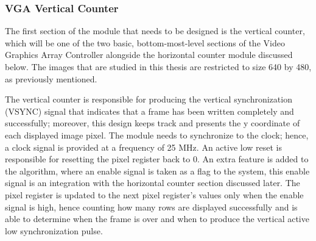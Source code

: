\subsubsection{VGA Vertical Counter}
\par The first section of the module that needs to be designed is the vertical counter, which will be one of the two basic, bottom-most-level sections of the Video Graphics Array Controller alongside the horizontal counter module discussed below. The images that are studied in this thesis are restricted to size 640 by 480, as previously mentioned. \newline
\par The vertical counter is responsible for producing the vertical synchronization (VSYNC) signal that indicates that a frame has been written completely and successfully; moreover, this design keeps track and presents the y coordinate of each displayed image pixel. The module needs to synchronize to the clock; hence, a clock signal is provided at a frequency of 25 MHz. An active low reset is responsible for resetting the pixel register back to 0. An extra feature is added to the algorithm, where an enable signal is taken as a flag to the system, this enable signal is an integration with the horizontal counter section discussed later. The pixel register is updated to the next pixel register's values only when the enable signal is high, hence counting how many rows are displayed successfully and is able to determine when the frame is over and when to produce the vertical active low synchronization pulse. \newline

